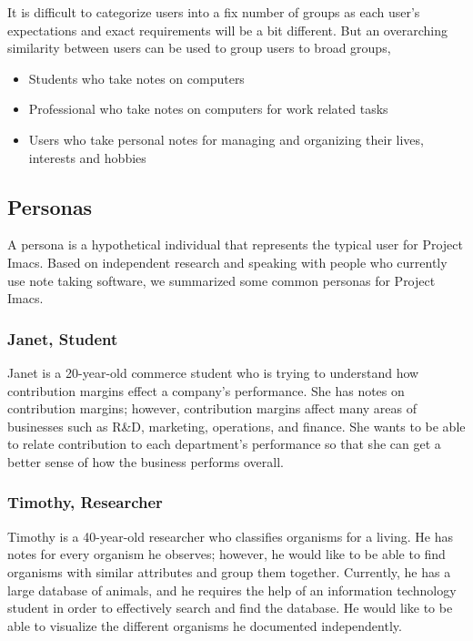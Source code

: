 \documentclass{article}
\begin{document}
It is difficult to categorize users into a fix number of groups as each user's
expectations and exact requirements will be a bit different. But an overarching similarity
between users can be used to group users to broad groups,

\begin{itemize}
\item Students who take notes on computers
\item Professional who take notes on computers for work related tasks
\item Users who take personal notes for managing and organizing their lives, interests
and hobbies
\end{itemize}

\subsection{Personas}
A persona is a hypothetical individual that represents the typical user for Project Imacs. Based on independent research and speaking with people who currently use note taking software, we summarized some common personas for Project Imacs.

\subsubsection{Janet, Student}
Janet is a 20-year-old commerce student who is trying to understand how contribution margins effect a company's performance. She has notes on contribution margins; however, contribution margins affect many areas of businesses such as R\&D, marketing, operations, and finance. She wants to be able to relate contribution to each department's performance so that she can get a better sense of how the business performs overall.

\subsubsection{Timothy, Researcher}
Timothy is a 40-year-old researcher who classifies organisms for a living. He has notes for every organism he observes; however, he would like to be able to find organisms with similar attributes and group them together. Currently, he has a large database of animals, and he requires the help of an information technology student in order to effectively search and find the database. He would like to be able to visualize the different organisms he documented independently.
\end{document}
